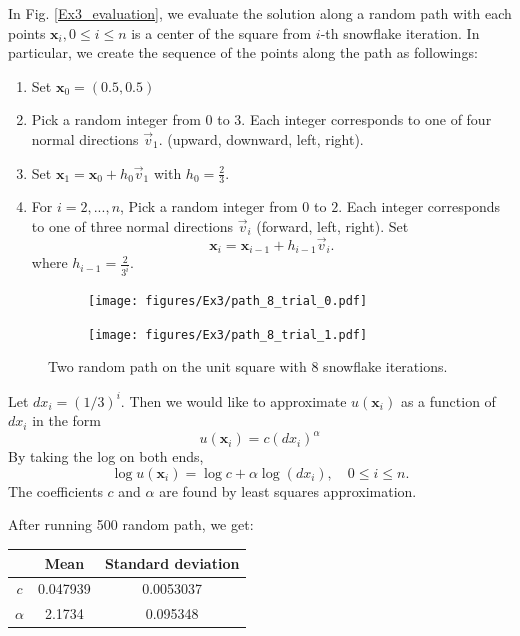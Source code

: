 \documentclass[12pt]{article}%
\theoremstyle{plain}
\numberwithin{equation}{section}
\begin{document}
 In Fig. \ref{Ex3_evaluation}, we evaluate the solution along a random path with each points $\textbf{x}_i,0\leq i\leq n$ is a center of the square from $i$-th snowflake iteration.  In particular, we create the sequence of the points along the path as followings: 
 \begin{enumerate}[1).]
 \item Set $\textbf{x}_0=(0.5,0.5)$
 \item Pick a random integer from $0$ to $3$. Each integer corresponds to one of four normal directions $\vec{v}_1$. (upward, downward, left, right).
 \item Set $\textbf{x}_1=\textbf{x}_0+h_0\vec{v}_1$ with $h_0=\frac{2}{3}$.
\item For $i=2,...,n$, Pick a random integer from $0$ to $2$.  Each integer corresponds to one of three normal directions $\vec{v}_i$ (forward, left, right). Set 
$$
\textbf{x}_i=\textbf{x}_{i-1}+h_{i-1}\vec{v}_i.
$$
where $h_{i-1}=\frac{2}{3^i}$.

 \end{enumerate}
  \begin{figure}[H]%
    \centering
         \begin{subfigure}[h]{0.45\linewidth}
        \texttt{[image: figures/Ex3/path\_8\_trial\_0.pdf]}
\end{subfigure}
 \begin{subfigure}[h]{0.45\linewidth}
    \texttt{[image: figures/Ex3/path\_8\_trial\_1.pdf]}
\end{subfigure}
  \caption{ Two random path on the unit square with $8$ snowflake iterations. }
 \end{figure}
Let $dx_i=(1/3)^i$. Then we would like to approximate $u(\textbf{x}_i)$ as a function of $dx_i$ in the form 
$$
u(\textbf{x}_i)=c(dx_i)^{\alpha}
$$
By taking the log on both ends, 
$$
\log u(\textbf{x}_i)=\log c+\alpha\log(dx_i),\quad 0\leq i\leq n.
$$
The coefficients $c$ and $\alpha$  are found by least squares approximation.  

After running 500 random path, we get:
\begin{table}[H]
\centering
\begin{tabular}{|c|c|c|}
              &  Mean & Standard deviation  \\ \hline
 $c$        &0.047939  & 0.0053037    \\
  $\alpha$& 2.1734 & 0.095348  
\end{tabular}
\end{table}
\end{document}
